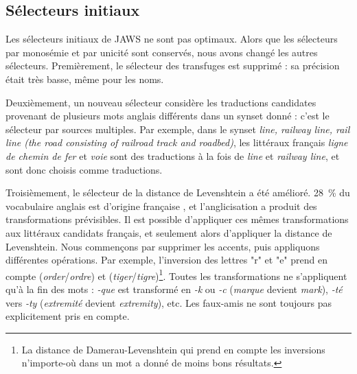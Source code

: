 \subsection{Sélecteurs initiaux}
\label{subsec:revisiting_extraction_heuristics}


Les sélecteurs initiaux de JAWS ne sont pas optimaux. Alors que les sélecteurs
par monosémie et par unicité sont conservés, nous avons changé les autres
sélecteurs. Premièrement, le sélecteur des transfuges est supprimé : sa
précision était très basse, même pour les noms.

Deuxièmement, un nouveau sélecteur considère les traductions candidates
provenant de plusieurs mots anglais différents dans un synset donné : c'est le
sélecteur par sources multiples. Par exemple, dans le synset \textit{line,
railway line, rail line (the road consisting of railroad track and roadbed)},
les littéraux français \textit{ligne de chemin de fer} et \textit{voie} sont
des traductions à la fois de \textit{line} et \textit{railway line}, et sont
donc choisis comme traductions.

Troisièmement, le sélecteur de la distance de Levenshtein a été amélioré. 28~\%
du vocabulaire anglais est d'origine française \citep{finkenstaedt1973ordered},
et l'anglicisation a produit des transformations prévisibles. Il est possible
d'appliquer ces mêmes transformations aux littéraux candidats français, et
seulement alors d'appliquer la distance de Levenshtein. Nous commençons par
supprimer les accents, puis appliquons différentes opérations. Par exemple,
l'inversion des lettres "r" et "e" prend en compte
(\textit{order}/\textit{ordre}) et (\textit{tiger}/\textit{tigre})\footnote{La
distance de Damerau-Levenshtein qui prend en compte les inversions n'importe-où
dans un mot \citep{damerau1964technique} a donné de moins bons résultats.}.
Toutes les transformations ne s'appliquent qu'à la fin des mots : \textit{-que}
est transformé en \textit{-k} ou \textit{-c} (\textit{marque} devient
\textit{mark}), \textit{-té} vers \textit{-ty} (\textit{extremité} devient
\textit{extremity}), etc. Les faux-amis ne sont toujours pas explicitement pris
en compte.

